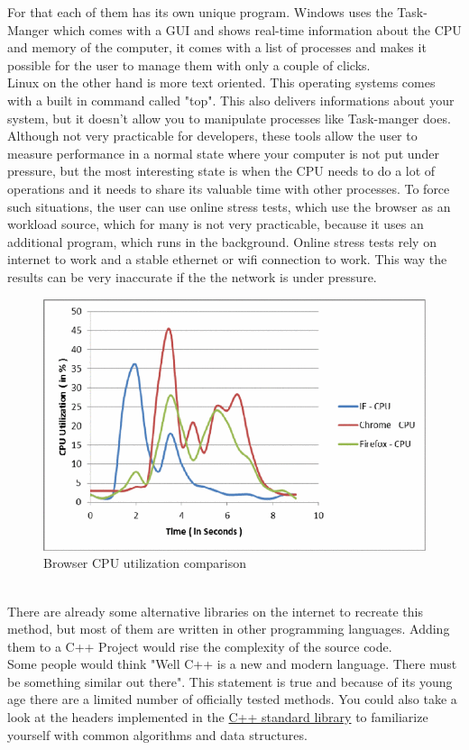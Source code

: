 For that each of them has its own unique program. Windows uses the \dq Task-Manger\dq{} which comes with a GUI and shows real-time information about the CPU and memory of the computer, it comes with a list of processes and makes it possible for the user to manage them with only a couple of clicks.\\
Linux on the other hand is more text oriented. This operating systems comes with a built in command called "top". This also delivers informations about your system, but it doesn't allow you to manipulate processes like \dq Task-manger\dq{} does. Although not very practicable for developers, these tools allow the user to measure performance in a normal state where your computer is not put under pressure, but the most interesting state is when the CPU needs to do a lot of operations and it needs to share its valuable time with other processes. To force such situations, the user can use online stress tests, which use the browser as an workload source, which for many is not very practicable, because it uses an additional program, which runs in the background. Online stress tests rely on internet to work and a stable ethernet or wifi connection to work. This way the results can be very inaccurate if the the network is under pressure.
\begin{figure}[h]
	\centering
	\includegraphics[scale=0.25]{figures/einleitung/browser_comparisson.png}
	\caption{Browser CPU utilization comparison\cite{6724273}}
	\label{browser_comp}
\end{figure}
\\
There are already some alternative libraries on the internet to recreate this method, but most of them are written in other programming languages. Adding them to a C++ Project would rise the complexity of the source code.\\
Some people would think "Well C++ is a new and modern language. There must be something similar out there". This statement is true and because of its young age there are a limited number of officially tested methods. You could also take a look at the headers implemented in the \href{https://en.cppreference.com/w/cpp/header}{C++ standard library} \cite{CppRef} to familiarize yourself with common algorithms and data structures.

